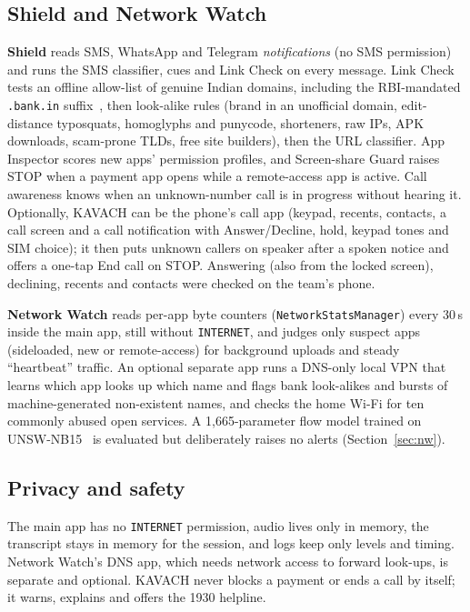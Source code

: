 \documentclass[conference]{IEEEtran}
\begin{document}
\subsection{Shield and Network Watch}
\textbf{Shield} reads SMS, WhatsApp and Telegram \emph{notifications} (no SMS permission) and runs the SMS classifier, cues and Link Check on every message. Link Check tests an offline allow-list of genuine Indian domains, including the RBI-mandated \texttt{.bank.in} suffix~\cite{rbi_bankin}, then look-alike rules (brand in an unofficial domain, edit-distance typosquats, homoglyphs and punycode, shorteners, raw IPs, APK downloads, scam-prone TLDs, free site builders), then the URL classifier. App Inspector scores new apps' permission profiles, and Screen-share Guard raises STOP when a payment app opens while a remote-access app is active. Call awareness knows when an unknown-number call is in progress without hearing it. Optionally, KAVACH can be the phone's call app (keypad, recents, contacts, a call screen and a call notification with Answer/Decline, hold, keypad tones and SIM choice); it then puts unknown callers on speaker after a spoken notice and offers a one-tap End call on STOP. Answering (also from the locked screen), declining, recents and contacts were checked on the team's phone.

\textbf{Network Watch} reads per-app byte counters (\texttt{NetworkStatsManager}) every 30\,s inside the main app, still without \texttt{INTERNET}, and judges only suspect apps (sideloaded, new or remote-access) for background uploads and steady ``heartbeat'' traffic. An optional separate app runs a DNS-only local VPN that learns which app looks up which name and flags bank look-alikes and bursts of machine-generated non-existent names, and checks the home Wi-Fi for ten commonly abused open services. A 1,665-parameter flow model trained on UNSW-NB15~\cite{unsw} is evaluated but deliberately raises no alerts (Section~\ref{sec:nw}).

\subsection{Privacy and safety}
The main app has no \texttt{INTERNET} permission, audio lives only in memory, the transcript stays in memory for the session, and logs keep only levels and timing. Network Watch's DNS app, which needs network access to forward look-ups, is separate and optional. KAVACH never blocks a payment or ends a call by itself; it warns, explains and offers the 1930 helpline.
\end{document}
